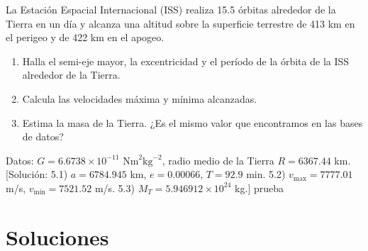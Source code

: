 \begin{texercise}
	La Estación Espacial Internacional (ISS) realiza 15.5 órbitas alrededor de la Tierra en un día y alcanza una altitud sobre la superficie terrestre de 413 km en el perigeo y de 422 km en el apogeo.
    \begin{enumerate}[label=\alph*)]
        \item Halla el semi-eje mayor, la excentricidad y el período de la órbita de la ISS alrededor de la Tierra.
	    \item Calcula las velocidades máxima y mínima alcanzadas.
	    \item Estima la masa de la Tierra. ¿Es el mismo valor que encontramos en las bases de datos?
    \end{enumerate}
	Datos: $G = 6.6738 \times 10^{-11} \text{ Nm}^2\text{kg}^{-2}$, radio medio de la Tierra $R = 6367.44$ km. [Solución: 5.1) $a = 6784.945$ km, $e = 0.00066$, $T = 92.9$ min. 5.2) $v_{\max} = 7777.01$ m/s, $v_{\min} = 7521.52$ m/s. 5.3) $M_T = 5.946912 \times 10^{24}$ kg.]
	\tcblower prueba
\end{texercise}

\tcbstoprecording

\section{{Soluciones}}

\tcbinputrecords

